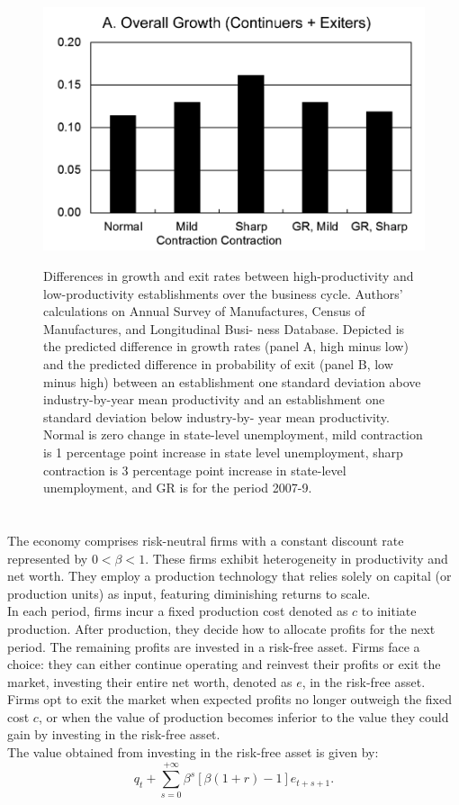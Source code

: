 \documentclass[12pt]{article}
\begin{document}
\begin{figure}
    \centering
    \includegraphics[scale = 0.35]{Plot1.7.png}
    \label{plot:1.7}
    \caption{Differences in growth and exit rates between high-productivity and
    low-productivity establishments over the business cycle. Authors' calculations on
    Annual Survey of Manufactures, Census of Manufactures, and Longitudinal Busi-
    ness Database. Depicted is the predicted difference in growth rates (panel A, high
    minus low) and the predicted difference in probability of exit (panel B, low minus
    high) between an establishment one standard deviation above industry-by-year
    mean productivity and an establishment one standard deviation below industry-by-
    year mean productivity. Normal is zero change in state-level unemployment, mild
    contraction is 1 percentage point increase in state level unemployment, sharp
    contraction is 3 percentage point increase in state-level unemployment, and GR is
    for the period 2007-9.
    }
\end{figure} 
\section{\cite{OsePap17}}
The economy comprises risk-neutral firms with a constant discount rate represented by $0 < \beta < 1$. These firms
exhibit heterogeneity in productivity and net worth. They employ a production technology that relies solely on capital
(or production units) as input, featuring diminishing returns to scale.
\\
In each period, firms incur a fixed production cost denoted as $c$ to initiate production. After production, they decide
how to allocate profits for the next period. The remaining profits are invested in a risk-free asset. Firms face a
choice: they can either continue operating and reinvest their profits or exit the market, investing their entire net
worth, denoted as $e$, in the risk-free asset.
\\
Firms opt to exit the market when expected profits no longer outweigh the fixed cost $c$, or when the value of
production becomes inferior to the value they could gain by investing in the risk-free asset.
\\
The value obtained from investing in the risk-free asset is given by:
\[
q_t + \sum_{s=0}^{+\infty}\beta^s[\beta(1+r)-1]e_{t+s+1}.
\]
\end{document}
